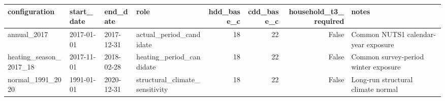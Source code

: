 \begin{tabular}{llllrrrl}
\toprule
configuration & start_date & end_date & role & hdd_base_c & cdd_base_c & household_t3_required & notes \\
\midrule
annual_2017 & 2017-01-01 & 2017-12-31 & actual_period_candidate & 18 & 22 & False & Common NUTS1 calendar-year exposure \\
heating_season_2017_18 & 2017-11-01 & 2018-02-28 & heating_period_candidate & 18 & 22 & False & Common survey-period winter exposure \\
normal_1991_2020 & 1991-01-01 & 2020-12-31 & structural_climate_sensitivity & 18 & 22 & False & Long-run structural climate normal \\
\bottomrule
\end{tabular}
